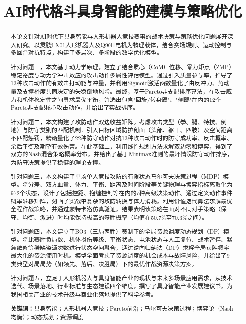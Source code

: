 \documentclass[a4paper,12pt]{article}
\title{\heiti AI时代格斗具身智能的建模与策略优化}
\author{}
\date{}
\numberwithin{equation}{section}
\numberwithin{table}{section}
\numberwithin{figure}{section}
\begin{document}
\maketitle
\thispagestyle{empty}

\begin{abstract}
\noindent 本论文针对AI时代下具身智能与人形机器人竞技赛事的战术决策与策略优化问题展开深入研究。以灵骁LX01人形机器人及Q90H电机为物理载体，结合赛场规则、运动控制与多回合对抗特点，构建了多层次、多阶段的数学优化模型。

\noindent 针对问题一，本文基于动力学原理，建立了结合质心（CoM）位移、零力矩点（ZMP）稳定裕度与动力学冲击效应的攻击动作多属性评估模型。通过引入质量参与率，推导了13种攻击动作的有效击打动能与冲量，并利用Sigmoid激活函数量化了由反冲力、角动量及支撑裕度共同决定的失稳倒地风险。最终，基于Pareto非支配排序算法，在攻击威力和机体稳定性之间寻求最优平衡，筛选出包含"回旋/转身踢"、"侧踢"在内的12个Pareto非支配核心攻击动作，并给出了实战排序。

\noindent 针对问题二，本文构建了攻防动作双边收益矩阵。考虑攻击类型（拳、腿、特技、倒地）与防守类别的匹配机制，引入目标区域防护剖面（头部、躯干、四肢）及空间距离不匹配惩罚，精确量化了22种防守动作对抗13种攻击动作时的防守成功率、反击概率、余后平衡及期望有效伤害。在此基础上，利用线性规划方法求解双边零和博弈，得到了双方的Nash混合策略概率分布，并给出了基于Minimax准则的最坏情况防守动作排序，为防守决策提供了稳健的理论支撑。

\noindent 针对问题三，本文构建了单场单人竞技攻防的有限状态马尔可夫决策过程（MDP）模型。将分差、双方血量、体力、平衡、距离及时间阶段等关键物理与博弈指标离散化为972个状态，设计了包括控距、抱缠控制等在内的7种高级决策动作。通过定义动作事件概率转移矩阵，刻画了实战中复杂的攻防转换与体力消耗。利用价值迭代算法求解最优全程作战策略，并通过蒙特卡洛仿真验证，结果表明该策略在面对不同对手策略（保守、均衡、激进）时均能保持极高的获胜概率（均值在50.7\%至70.3\%之间）。

\noindent 针对问题四，本文建立了BO3（三局两胜）赛制下的全局资源调度动态规划（DP）模型。将比赛胜负局数、机体损伤等级、平衡状态、电池状态与人工复位、战术暂停、紧急维修等稀缺资源次数进行状态空间融合，通过逆向归纳法（DP）求解全局获胜概率最大化的资源使用时机。模型全面考虑了资源调度的机会成本与故障风险，并给出了9类典型对局局势（如领先、落后、决胜局）下的最优作战资源决策方案。

\noindent 针对问题五，立足于人形机器人与具身智能产业的现状与未来多场景应用需求，从技术迭代、场景落地、行业标准与生态建设四个维度，撰写了具身智能产业发展建议书，为我国相关产业的技术升级与商业化落地提供了科学参考。

\vspace{0.5em}
\noindent \textbf{关键词：}具身智能；人形机器人竞技；Pareto前沿；马尔可夫决策过程；博弈论（Nash均衡）；动态规划；资源调度
\end{abstract}
\end{document}
